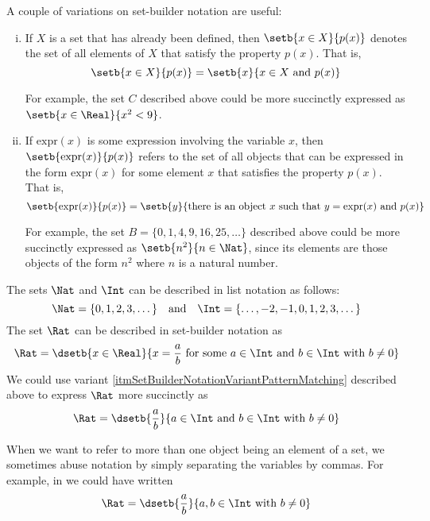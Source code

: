 \begin{itemize}
A couple of variations on set-builder notation are useful:
\begin{enumerate}[(i)]
\item If $X$ is a set that has already been defined, then $\setb{x \in X}{p(x)}$ denotes the set of all elements of $X$ that satisfy the property $p(x)$. That is,
\[ \setb{x \in X}{p(x)} = \setb{x}{x \in X \text{ and } p(x)} \]

For example, the set $C$ described above could be more succinctly expressed as $\setb{x \in \Real}{x^2 < 9}$.

\item\label{itmSetBuilderNotationVariantPatternMatching} If $\text{expr}(x)$ is some expression involving the variable $x$, then $\setb{\text{expr}(x)}{p(x)}$ refers to the set of all objects that can be expressed in the form $\mathrm{expr}(x)$ for some element $x$ that satisfies the property $p(x)$. That is,
\[ \setb{\mathrm{expr}(x)}{p(x)} = \setb{y}{\text{there is an object } x \text{ such that } y=\mathrm{expr}(x) \text{ and } p(x)} \]

For example, the set $B = \{ 0, 1, 4, 9, 16, 25, \dots \}$ described above could be more succinctly expressed as $\setb{n^2}{n \in \Nat}$, since its elements are those objects of the form $n^2$ where $n$ is a natural number.
\end{enumerate}
\end{itemize}

\begin{example}
\label{exSetNotationNumberSets}
The sets $\Nat$ and $\Int$ can be described in list notation as follows:
\[ \Nat = \{ 0, 1, 2, 3, \dots \} \quad \text{and} \quad \Int = \{ \dots, {-2}, {-1}, 0, 1, 2, 3, \dots \} \]
The set $\Rat$ can be described in set-builder notation as
\[ \Rat = \dsetb{x \in \Real}{x = \dfrac{a}{b} \text{ for some } a \in \Int \text{ and } b \in \Int \text{ with } b \ne 0} \]
We could use variant \ref{itmSetBuilderNotationVariantPatternMatching} described above to express $\Rat$ more succinctly as
\[ \Rat = \dsetb{\dfrac{a}{b}}{a \in \Int \text{ and } b \in \Int \text{ with } b \ne 0} \]
\end{example}

\begin{aside}
When we want to refer to more than one object being an element of a set, we sometimes abuse notation by simply separating the variables by commas. For example, in  we could have written
\[ \Rat = \dsetb{\dfrac{a}{b}}{a,b \in \Int \text{ with } b \ne 0} \]
\end{aside}

